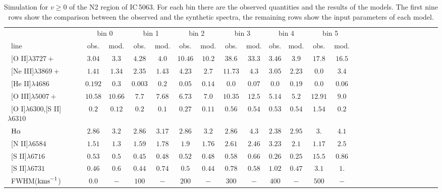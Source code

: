 \documentclass[../thesis.tex]{subfiles}
\begin{document}
\begin{landscape}
\begin{table}
\centering
\caption{Simulation for $v\ge0$ of the N2 region of IC\,5063. For each bin there are the observed quantities and the results of the models. The first nine rows show the comparison between the observed and the synthetic spectra, the remaining rows show the input parameters of each model.}
\label{tab:sim_n2+}

\small{
\begin{tabular}{lcccccccccccccccccccccccc}   
\hline
\ &\multicolumn{2}{c}{bin 0} &\multicolumn{2}{c}{bin 1}&\multicolumn{2}{c}{bin 2}&\multicolumn{2}{c}{bin 3}&\multicolumn{2}{c}{bin 4}&\multicolumn{2}{c}{bin 5}\\
\   line              &obs.  &mod. & obs.  &mod. &obs.&mod.  &obs.  &mod.&obs.  &mod. &obs.  &mod. \\ 
\hline
\ [O II]$\lambda3727+ $         &$3.04  $&$3.3   $&$4.28   $&$ 4.0  $&$10.46$&$10.2  $&$38.6  $&$33.3 $&$3.46  $&$3.9   $&$17.8  $&$16.5 $ \\
\ [Ne III]$\lambda3869+ $       &$1.41  $&$1.34  $&$2.35   $&$ 1.43 $&$4.23 $&$2.7   $&$11.73 $&$4.3   $&$3.05  $&$2.23  $&$0.0   $&$3.4   $\\
\ [He II]$\lambda4686$           &$0.192 $&$0.3   $&$0.003  $&$ 0.2  $&$0.05 $&$0.14  $&$0.0   $&$0.07  $&$0.0   $&$0.19  $&$0.0   $&$0.06$ \\
\ [O III]$\lambda5007+ $        &$10.58 $&$10.66 $&$ 7.7   $&$  7.68$&$ 6.73$&$ 7.0  $&$10.35 $&$12.5  $&$5.14  $&$  5.2 $&$12.91 $&$ 9.0 $\\
\ [O I]$\lambda6300$,[S II]$\lambda6310$  &$0.2   $&$0.12  $&$0.2    $&$0.1   $&$0.27 $&$0.11  $&$0.56  $&$0.54  $&$0.53  $&$0.54  $&$1.54  $&$0.2  $\\
\ $\Ha$                 &$2.86  $&$3.2   $&$2.86   $&$ 3.17 $&$2.86 $&$3.2   $&$2.86  $&$4.3   $&$2.38  $&$2.95  $&$3.    $&$4.1 $ \\
\ [N II]$\lambda6584$           &$1.51  $&$1.3   $&$1.59   $&$ 1.78 $&$1.9  $&$1.76  $&$2.61  $&$2.46  $&$3.23  $&$2.1   $&$1.17  $&$2.5  $\\
\ [S II]$\lambda6716$           &$0.53  $&$0.5   $&$0.45   $&$ 0.48 $&$0.52 $&$0.48  $&$0.58  $&$0.66  $&$0.26  $&$0.25  $&$15.5  $&$0.86$ \\
\ [S II]$\lambda6731$            &$0.46  $&$0.6   $&$0.44   $&$ 0.74 $&$0.5  $&$0.44  $&$0.78  $&$0.58  $&$1.02  $&$0.47  $&$3.1   $&$1.  $ \\
\ FWHM($\si{\kms}$)          &$0.0   $&$-     $&$100    $&$-     $&$200  $&$-     $&$300   $&$-     $&$400   $&$-     $&$ 500  $&$-$     \\

\end{tabular}}
\end{table}
\end{landscape}
\end{document}
